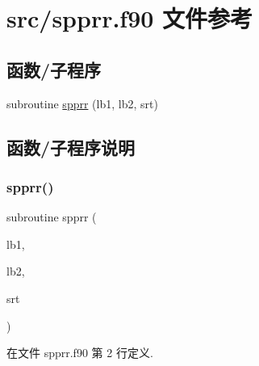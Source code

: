 \hypertarget{spprr_8f90}{}\section{src/spprr.f90 文件参考}
\label{spprr_8f90}
\subsection*{函数/子程序}
\begin{DoxyCompactItemize}
\item 
subroutine \mbox{\hyperlink{spprr_8f90_a2057ccb0cc7b873244414a55ec151fbc}{spprr}} (lb1, lb2, srt)
\end{DoxyCompactItemize}


\subsection{函数/子程序说明}
\mbox{\label{spprr_8f90_a2057ccb0cc7b873244414a55ec151fbc}} 
\subsubsection{\texorpdfstring{spprr()}{spprr()}}
{\footnotesize\ttfamily subroutine spprr (\begin{DoxyParamCaption}\item[{}]{lb1,  }\item[{}]{lb2,  }\item[{}]{srt }\end{DoxyParamCaption})}



在文件 spprr.\+f90 第 2 行定义.

